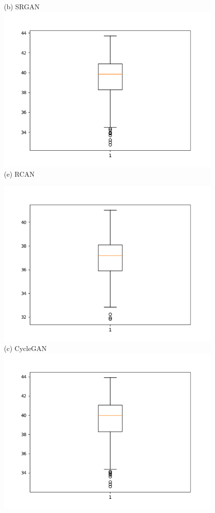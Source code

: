 \documentclass[conference]{IEEEtran}
\begin{document}
\begin{figure}[h!]
\begin{minipage}{0.3\textwidth}
   (b) SRGAN
  \includegraphics[width=\textwidth,height=0.2\textheight]{rcan_rgb.png}
   (e) RCAN 
  \end{minipage}%
  \begin{minipage}{0.3\textwidth}
  \centering
  \includegraphics[width=\textwidth,height=0.2\textheight]{Figures/cyclegan_rgb.png}
  (c) CycleGAN 
  \includegraphics[width=\textwidth,height=0.2\textheight]{proposed_rgb.png}

\end{minipage}
\end{figure}
\end{document}
